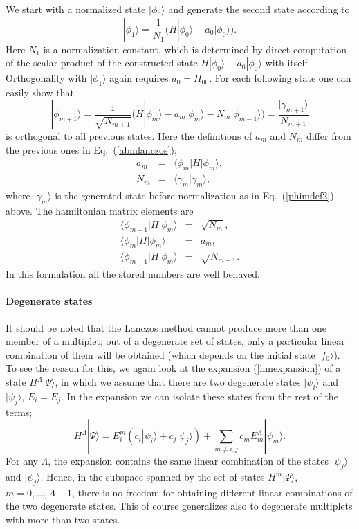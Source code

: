 \documentclass[draft,numberedheadings]{aipproc}
\begin{document}
We start with a normalized state $|\phi_0\rangle$ and generate the second state according to
\begin{equation}
|\phi_1\rangle = \frac{1}{N_1}\bigl (H|\phi_0\rangle - a_0|\phi_0\rangle \bigr ).
\label{phi1def2}
\end{equation}
Here $N_1$ is a normalization constant, which is determined by direct computation of the scalar product of the constructed state 
$H|\phi_0\rangle - a_0|\phi_0\rangle$ with itself. Orthogonality with $|\phi_1\rangle$ again requires $a_0=H_{00}$. For each following state one can 
easily show that
\begin{equation}
|\phi_{m+1}\rangle = \frac{1}{\sqrt{N_{m+1}}}\bigl (H|\phi_m\rangle - a_m|\phi_m\rangle - N_m|\phi_{m-1}\rangle \bigr ) = \frac{|\gamma_{m+1}\rangle}{N_{m+1}} 
\label{phimdef2}
\end{equation}
is orthogonal to all previous states. Here the definitions of $a_m$ and $N_m$ differ from the previous ones in Eq.~(\ref{abmlanczos});
\begin{eqnarray}
a_m & = & \langle \phi_m|H|\phi_m\rangle, \nonumber \\
N_m & = & \langle \gamma_m|\gamma_m\rangle,
\end{eqnarray}
where $|\gamma_m\rangle$ is the generated state before normalization as in Eq.~(\ref{phimdef2}) above. The hamiltonian matrix elements are
\begin{eqnarray}
\langle \phi_{m-1}|H|\phi_m\rangle & = & \sqrt{N_{m}}, \nonumber \\
\langle \phi_{m}|H|\phi_m\rangle & = & a_{m},  \\
\langle \phi_{m+1}|H|\phi_m\rangle & = &  \sqrt{N_{m+1}} . \nonumber 
\label{tridia2}
\end{eqnarray}
In this formulation all the stored numbers are well behaved.

\paragraph{Degenerate states}

It should be noted that the Lanczos method cannot produce more than one member of a multiplet; out of a degenerate set of states, only a 
particular linear combination of them will be obtained (which depends on the initial state $|f_0\rangle$). To see the reason for this, we 
again look at the expansion (\ref{hmexpansion}) of a state $H^\Lambda|\Psi \rangle$, in which we assume that there are two degenerate states 
$|\psi_i\rangle$ and $|\psi_j\rangle$, $E_i=E_j$. In the expansion we can isolate these states from the rest of the terms;
\begin{equation}
H^\Lambda|\Psi \rangle = E^m_{i}(c_i|\psi_i\rangle +c_j|\psi_j\rangle) + \sum_{m\not=i,j} c_m E^\Lambda_m |\psi_m\rangle.
\end{equation}
For any $\Lambda$, the expansion contains the same linear combination of the states $|\psi_j\rangle$ and $|\psi_j\rangle$. 
Hence, in the subspace spanned by the set of states $H^m|\Psi \rangle$, $m=0,\ldots,\Lambda-1$, there is no freedom for obtaining 
different linear combinations of the two degenerate states. This of course generalizes also to degenerate multiplets with more than two states.
\end{document}

